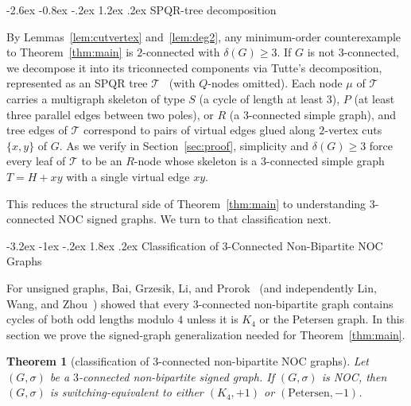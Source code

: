 \documentclass[10pt,letterpaper]{article}
\makeatletter
\renewcommand\section{\@startsection{section}{1}{\z@}%
  {-3.2ex \@plus -1ex \@minus -.2ex}%
  {1.8ex \@plus .2ex}%
  {\normalfont\large\bfseries}}
\renewcommand\subsection{\@startsection{subsection}{2}{\z@}%
  {-2.6ex \@plus -0.8ex \@minus -.2ex}%
  {1.2ex \@plus .2ex}%
  {\normalfont\normalsize\bfseries}}
\theoremstyle{zetaplain}
\newtheorem{theorem}{Theorem}[section]
\theoremstyle{zetadef}
\theoremstyle{remark}
\numberwithin{equation}{section}
\makeatother
\begin{document}
\subsection{SPQR-tree decomposition}

By Lemmas~\ref{lem:cutvertex} and~\ref{lem:deg2}, any minimum-order counterexample to Theorem~\ref{thm:main} is $2$-connected with $\delta(G) \ge 3$. If $G$ is not $3$-connected, we decompose it into its triconnected components via Tutte's decomposition, represented as an SPQR tree $\mathcal{T}$~\cite{Tut66,DT96} (with $Q$-nodes omitted). Each node $\mu$ of $\mathcal{T}$ carries a multigraph skeleton of type $S$ (a cycle of length at least $3$), $P$ (at least three parallel edges between two poles), or $R$ (a $3$-connected simple graph), and tree edges of $\mathcal{T}$ correspond to pairs of virtual edges glued along $2$-vertex cuts $\{x, y\}$ of $G$. As we verify in Section~\ref{sec:proof}, simplicity and $\delta(G) \ge 3$ force every leaf of $\mathcal{T}$ to be an $R$-node whose skeleton is a $3$-connected simple graph $T = H + xy$ with a single virtual edge $xy$.

This reduces the structural side of Theorem~\ref{thm:main} to understanding $3$-connected NOC signed graphs. We turn to that classification next.

\section{Classification of \texorpdfstring{$3$}{3}-Connected Non-Bipartite NOC Graphs}\label{sec:3conn}

For unsigned graphs, Bai, Grzesik, Li, and Prorok~\cite[Lemma~5.4]{BGLP26} (and independently Lin, Wang, and Zhou~\cite{LWZ25}) showed that every $3$-connected non-bipartite graph contains cycles of both odd lengths modulo $4$ unless it is $K_4$ or the Petersen graph. In this section we prove the signed-graph generalization needed for Theorem~\ref{thm:main}.

\begin{theorem}[classification of $3$-connected non-bipartite NOC graphs]\label{thm:3conn}
Let $(G, \sigma)$ be a $3$-connected non-bipartite signed graph. If $(G, \sigma)$ is NOC, then $(G, \sigma)$ is switching-equivalent to either $(K_4, +1)$ or $(\mathrm{Petersen}, -1)$.
\end{theorem}
\end{document}
